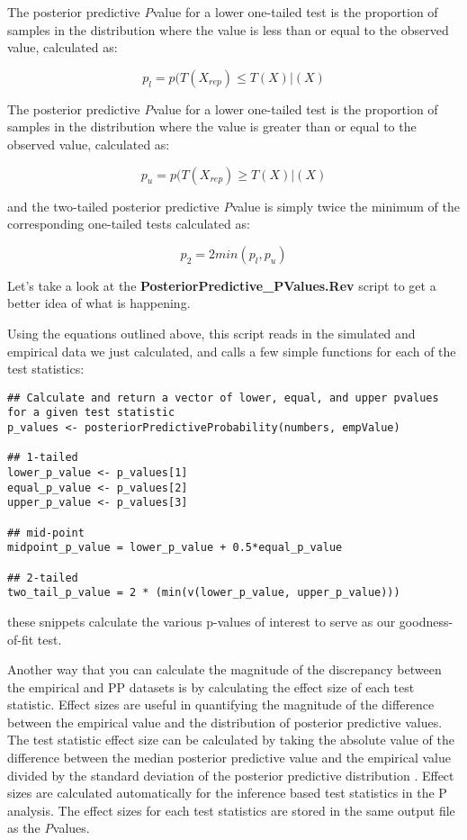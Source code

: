 The posterior predictive \textit{P}\-value for a lower one-tailed test is the proportion of samples in the distribution
where the value is less than or equal to the observed value, calculated as:

\begin{equation*} 
    p_l=p(T(X_{rep})\leqslant T(X)|(X)
\end{equation*}

The posterior predictive \textit{P}\-value for a lower one-tailed test is the proportion of samples in the distribution
where the value is greater than or equal to the observed value, calculated as:

\begin{equation*} 
    p_u=p(T(X_{rep})\geqslant T(X)|(X)
\end{equation*}

and the two-tailed posterior predictive \textit{P}\-value is simply twice the minimum of the corresponding one-tailed tests
calculated as:

\begin{equation*} 
p_2=2min(p_l,p_u)
\end{equation*}

Let's take a look at the \textbf{PosteriorPredictive\_PValues.Rev} script to get a better idea of what is 
happening.

Using the equations outlined above, this script reads in the simulated and empirical data we just calculated, and calls a few simple functions
for each of the test statistics:

{\tt \begin{Snugshade}[184,207,236]
\begin{lstlisting}
## Calculate and return a vector of lower, equal, and upper pvalues for a given test statistic
p_values <- posteriorPredictiveProbability(numbers, empValue)

## 1-tailed
lower_p_value <- p_values[1] 
equal_p_value <- p_values[2] 
upper_p_value <- p_values[3] 

## mid-point
midpoint_p_value = lower_p_value + 0.5*equal_p_value

## 2-tailed
two_tail_p_value = 2 * (min(v(lower_p_value, upper_p_value)))
\end{lstlisting}
\end{Snugshade}}

these snippets calculate the various p-values of interest to serve as our goodness-of-fit test. 


Another way that you can calculate the magnitude of the discrepancy between the empirical and PP datasets is by
calculating the effect size of each test statistic. Effect sizes are useful in quantifying the magnitude of the difference between the 
empirical value and the distribution of posterior predictive values. The test statistic effect size can be calculated by taking the 
absolute value of the difference between the median posterior predictive value and the empirical value divided by 
the standard deviation of the posterior predictive distribution \citep{Doyle2015-qb}. Effect sizes are calculated automatically for the inference based test statistics in the P analysis. The effect sizes for each test statistics are stored in the same output file as the \textit{P}\-values. 

